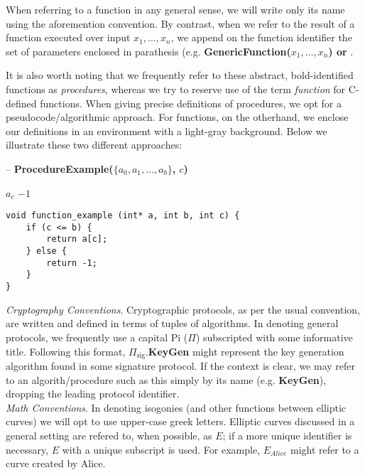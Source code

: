 When referring to a function in any general sense, we will write only its name using the aforemention convention. By contrast, when we refer to the result of a function executed over input $x_{1}, ..., x_{n}$, we append on the function identifier the set of parameters enclosed in parathesis (e.g. \textbf{GenericFunction($x_{1}, ..., x_{n}$) or }. 

It is also worth noting that we frequently refer to these abstract, bold-identified functions as \textit{procedures}, whereas we try to reserve use of the term \textit{function} for C-defined functions. When giving precise definitions of procedures, we opt for a pseudocode/algorithmic approach. For functions, on the otherhand, we enclose our definitions in an environment with a light-gray background. Below we illustrate these two different approaches:\\

\begin{algorithm}
\caption{-- \textbf{ProcedureExample($\{a_0, a_1, ... , a_b\}$, $c$)}}\label{alg:procedureexample}
\begin{algorithmic}[1]
	\State \Return $a_c$
\Else
	\State \Return $-1$
\EndIf
\end{algorithmic}
\end{algorithm}

\label{code:pbinv}
\begin{lstlisting}
void function_example (int* a, int b, int c) {
	if (c <= b) {
		return a[c];
	} else {
		return -1;
	}
}
\end{lstlisting}

\noindent
\textit{Cryptography Conventions}. Cryptographic protocols, as per the usual convention, are written and defined in terms of tuples of algorithms. In denoting general protocols, we frequently use a capital Pi ($\Pi$) subscripted with some informative title. Following this format, $\Pi_{\text{sig}}$.\textbf{KeyGen} might represent the key generation algorithm found in some signature protocol. If the context is clear, we may refer to an algorith/procedure such as this simply by its name (e.g. \textbf{KeyGen}), dropping the leading protocol identifier.\\

\noindent
\textit{Math Conventions}. In denoting isogonies (and other functions between elliptic curves) we will opt to use upper-case greek letters. Elliptic curves discussed in a general setting are refered to, when possible, as $E$; if a more unique identifier is necessary, $E$ with a unique subscript is used. For example, $E_{Alice}$ might refer to a curve created by Alice.  


